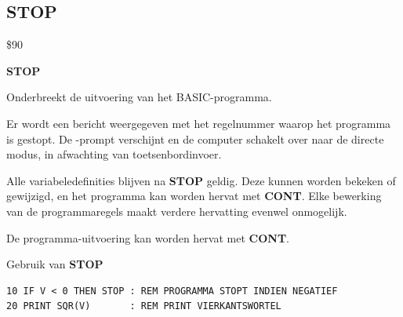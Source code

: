 
\newpage
\subsection{STOP}
\begin{description}[leftmargin=2cm,style=nextline]
\item [Token:]    \$90

\item [Formaat:]   {\bf STOP}

\item [Gebruik:]    Onderbreekt de uitvoering van het BASIC-programma.

                  Er wordt een bericht weergegeven met het regelnummer waarop het programma is gestopt. De -prompt verschijnt en de computer schakelt over naar de directe modus, in afwachting van toetsenbordinvoer.

\item [Opmerkingen:]  Alle variabeledefinities blijven na {\bf STOP} geldig. Deze kunnen worden bekeken of gewijzigd, en het programma kan worden hervat met {\bf CONT}. Elke bewerking van de programmaregels maakt verdere hervatting evenwel onmogelijk.

                  De programma-uitvoering kan worden hervat met {\bf CONT}.

\item [Voorbeeld:]  Gebruik van {\bf STOP}

\begin{tcolorbox}[colback=black,coltext=white]
\verbatimfont{\codefont}
\begin{verbatim}
10 IF V < 0 THEN STOP : REM PROGRAMMA STOPT INDIEN NEGATIEF
20 PRINT SQR(V)       : REM PRINT VIERKANTSWORTEL
\end{verbatim}
\end{tcolorbox}
\end{description}


\newpage
